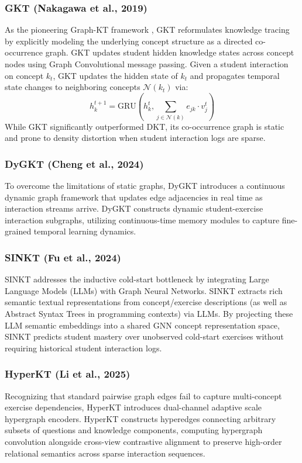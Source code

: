 ﻿\documentclass[10pt,journal,compsoc]{IEEEtran}
\begin{document}
\subsubsection{GKT (Nakagawa et al., 2019)}
As the pioneering Graph-KT framework \cite{KT004_GKT_2019}, GKT reformulates knowledge tracing by explicitly modeling the underlying concept structure as a directed co-occurrence graph. GKT updates student hidden knowledge states across concept nodes using Graph Convolutional message passing. Given a student interaction on concept $k_t$, GKT updates the hidden state of $k_t$ and propagates temporal state changes to neighboring concepts $\mathcal{N}(k_t)$ via:
\begin{equation}
h_{k}^{t+1} = \text{GRU}\left( h_{k}^{t}, \sum_{j \in \mathcal{N}(k)} e_{jk} \cdot v_{j}^t \right)
\end{equation}
While GKT significantly outperformed DKT, its co-occurrence graph is static and prone to density distortion when student interaction logs are sparse.

\subsubsection{DyGKT (Cheng et al., 2024)}
To overcome the limitations of static graphs, DyGKT \cite{KT038_DyGKT_2024} introduces a continuous dynamic graph framework that updates edge adjacencies in real time as interaction streams arrive. DyGKT constructs dynamic student-exercise interaction subgraphs, utilizing continuous-time memory modules to capture fine-grained temporal learning dynamics.

\subsubsection{SINKT (Fu et al., 2024)}
SINKT \cite{KT044_SINKT_2024} addresses the inductive cold-start bottleneck by integrating Large Language Models (LLMs) with Graph Neural Networks. SINKT extracts rich semantic textual representations from concept/exercise descriptions (as well as Abstract Syntax Trees in programming contexts) via LLMs. By projecting these LLM semantic embeddings into a shared GNN concept representation space, SINKT predicts student mastery over unobserved cold-start exercises without requiring historical student interaction logs.

\subsubsection{HyperKT (Li et al., 2025)}
Recognizing that standard pairwise graph edges fail to capture multi-concept exercise dependencies, HyperKT \cite{KT066_HyperKT_2025} introduces dual-channel adaptive scale hypergraph encoders. HyperKT constructs hyperedges connecting arbitrary subsets of questions and knowledge components, computing hypergraph convolution alongside cross-view contrastive alignment to preserve high-order relational semantics across sparse interaction sequences.
\end{document}
